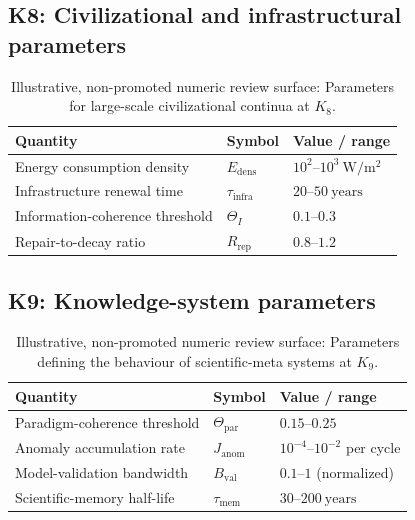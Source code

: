 
\subsection*{K8: Civilizational and infrastructural parameters}

\begin{table}[htbp]
  \centering
  \caption{Illustrative, non-promoted numeric review surface: Parameters for large-scale civilizational continua at \(K_8\).}
  \label{tab:k8-civilizational-parameters}
  \begin{tabular}{@{}L{0.44\textwidth}L{0.16\textwidth}L{0.23\textwidth}@{}}
    \hline
    Quantity & Symbol & Value / range \\
    \hline
    Energy consumption density & \(E_\mathrm{dens}\)
        & \(10^2\text{–}10^3~\mathrm{W/m^2}\) \\
    Infrastructure renewal time & \(\tau_\mathrm{infra}\)
        & \(20\text{–}50~\mathrm{years}\) \\
    Information-coherence threshold & \(\Theta_I\)
        & \(0.1\text{–}0.3\) \\
    Repair-to-decay ratio & \(R_\mathrm{rep}\)
        & \(0.8\text{–}1.2\) \\
    \hline
  \end{tabular}
\end{table}


\subsection*{K9: Knowledge-system parameters}

\begin{table}[htbp]
  \centering
  \caption{Illustrative, non-promoted numeric review surface: Parameters defining the behaviour of scientific-meta systems at \(K_9\).}
  \label{tab:k9-knowledge-parameters}
  \begin{tabular}{@{}L{0.44\textwidth}L{0.16\textwidth}L{0.23\textwidth}@{}}
    \hline
    Quantity & Symbol & Value / range \\
    \hline
    Paradigm-coherence threshold & \(\Theta_{\mathrm{par}}\)
        & \(0.15\text{–}0.25\) \\
    Anomaly accumulation rate & \(J_\mathrm{anom}\)
        & \(10^{-4}\text{–}10^{-2}\) per cycle \\
    Model-validation bandwidth & \(B_\mathrm{val}\)
        & \(0.1\text{–}1\) (normalized) \\
    Scientific-memory half-life & \(\tau_\mathrm{mem}\)
        & \(30\text{–}200~\mathrm{years}\) \\
    \hline
  \end{tabular}
\end{table}

